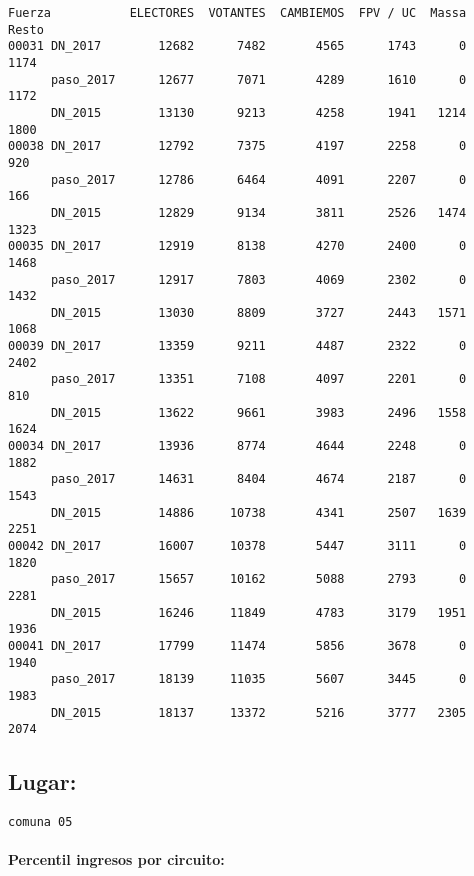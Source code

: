 \documentclass[11pt]{article}
\begin{document}
    \begin{verbatim}
Fuerza           ELECTORES  VOTANTES  CAMBIEMOS  FPV / UC  Massa  Resto
00031 DN_2017        12682      7482       4565      1743      0   1174
      paso_2017      12677      7071       4289      1610      0   1172
      DN_2015        13130      9213       4258      1941   1214   1800
00038 DN_2017        12792      7375       4197      2258      0    920
      paso_2017      12786      6464       4091      2207      0    166
      DN_2015        12829      9134       3811      2526   1474   1323
00035 DN_2017        12919      8138       4270      2400      0   1468
      paso_2017      12917      7803       4069      2302      0   1432
      DN_2015        13030      8809       3727      2443   1571   1068
00039 DN_2017        13359      9211       4487      2322      0   2402
      paso_2017      13351      7108       4097      2201      0    810
      DN_2015        13622      9661       3983      2496   1558   1624
00034 DN_2017        13936      8774       4644      2248      0   1882
      paso_2017      14631      8404       4674      2187      0   1543
      DN_2015        14886     10738       4341      2507   1639   2251
00042 DN_2017        16007     10378       5447      3111      0   1820
      paso_2017      15657     10162       5088      2793      0   2281
      DN_2015        16246     11849       4783      3179   1951   1936
00041 DN_2017        17799     11474       5856      3678      0   1940
      paso_2017      18139     11035       5607      3445      0   1983
      DN_2015        18137     13372       5216      3777   2305   2074
    \end{verbatim}

    
    \hypertarget{lugar}{%
\subsection{Lugar:}\label{lugar}}

    
    \begin{Verbatim}[commandchars=\\\{\}]
comuna 05

    \end{Verbatim}

    \hypertarget{percentil-ingresos-por-circuito}{%
\paragraph{Percentil ingresos por
circuito:}\label{percentil-ingresos-por-circuito}}
\end{document}
